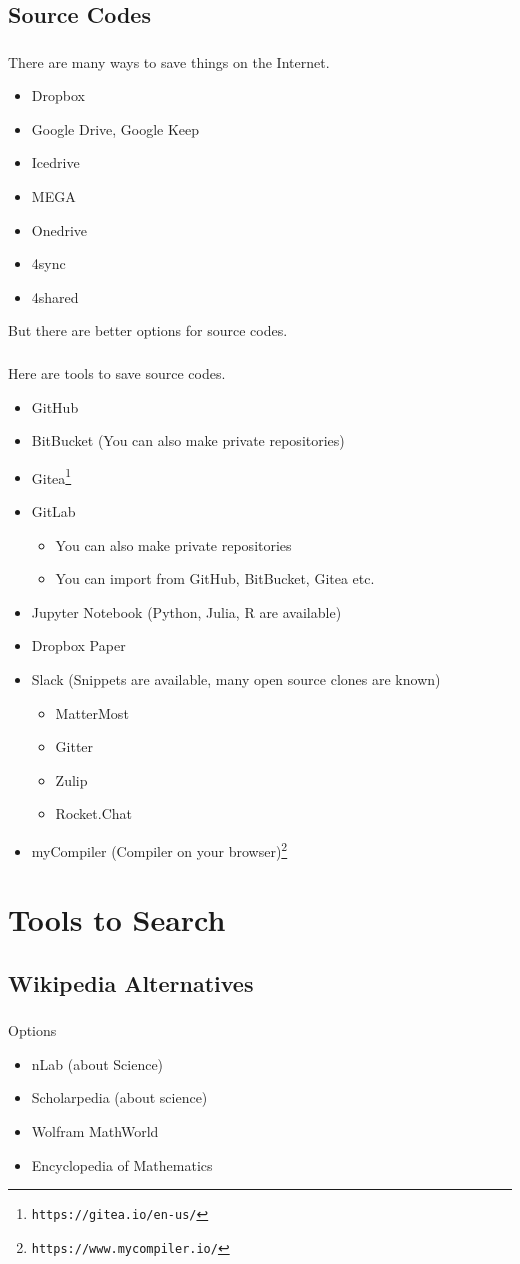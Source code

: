 \documentclass[dvipdfmx,10pt]{beamer}
\newcommand{\bb}{\begin{block}}
\newcommand{\eb}{\end{block}}
\newcommand{\ft}{\frametitle}
\newcommand{\bit}{\begin{itemize}}
\newcommand{\eit}{\end{itemize}}
\begin{document}
\subsection{Source Codes}
\begin{frame}\ft{\insertsubsection}
There are many ways to save things on the Internet.
\bit
\item Dropbox
\item Google Drive, Google Keep
\item Icedrive
\item MEGA
\item Onedrive
\item 4sync
\item 4shared
\eit
But there are better options for source codes.
\end{frame}
\begin{frame}\ft{\insertsubsection}
\footnotesize
Here are tools to save source codes.
\bit
\item GitHub
\item BitBucket (You can also make private repositories)
\item Gitea\footnote{\texttt{https://gitea.io/en-us/}}
\item GitLab
\bit
\item You can also make private repositories
\item You can import from GitHub, BitBucket, Gitea etc.
\eit
\item Jupyter Notebook (Python, Julia, R are available)
\item Dropbox Paper
\item Slack (Snippets are available, many open source clones are known)
\bit
\item MatterMost
\item Gitter
\item Zulip
\item Rocket.Chat
\eit
\item myCompiler (Compiler on your browser)\footnote{\texttt{https://www.mycompiler.io/}}
\eit
\normalsize
\end{frame}
\section{Tools to Search}
\subsection{Wikipedia Alternatives}
\begin{frame}\ft{\insertsubsection}
\bb{Options}
\bit
\item nLab (about Science)
\item Scholarpedia (about science)
\item Wolfram MathWorld
\item Encyclopedia of Mathematics
\eit
\eb
\end{frame}
\end{document}
